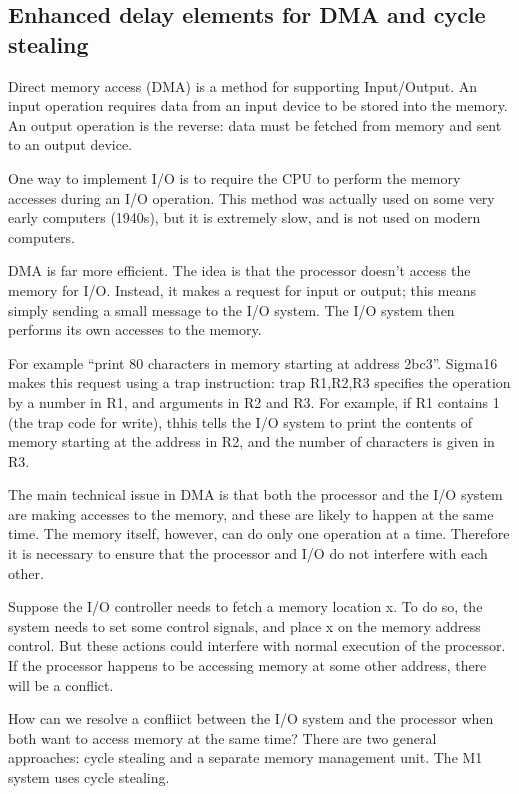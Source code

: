 \documentclass[11pt]{article}
\begin{document}
\subsection{Enhanced delay elements for DMA and cycle stealing}
\label{sec:org648e636}

Direct memory access (DMA) is a method for supporting Input/Output.
An input operation requires data from an input device to be stored
into the memory.  An output operation is the reverse: data must be
fetched from memory and sent to an output device.

One way to implement I/O is to require the CPU to perform the memory
accesses during an I/O operation.  This method was actually used on
some very early computers (1940s), but it is extremely slow, and is
not used on modern computers.

DMA is far more efficient.  The idea is that the processor doesn't
access the memory for I/O.  Instead, it makes a request for input or
output; this means simply sending a small message to the I/O system.
The I/O system then performs its own accesses to the memory.

For example ``print 80 characters in memory starting at address
2bc3''.  Sigma16 makes this request using a trap instruction: trap
R1,R2,R3 specifies the operation by a number in R1, and arguments in
R2 and R3.  For example, if R1 contains 1 (the trap code for write),
thhis tells the I/O system to print the contents of memory starting at
the address in R2, and the number of characters is given in R3.

The main technical issue in DMA is that both the processor and the I/O
system are making accesses to the memory, and these are likely to
happen at the same time.  The memory itself, however, can do only one
operation at a time.  Therefore it is necessary to ensure that the
processor and I/O do not interfere with each other.

Suppose the I/O controller needs to fetch a memory location x.  To do
so, the system needs to set some control signals, and place x on the
memory address control.  But these actions could interfere with normal
execution of the processor.  If the processor happens to be accessing
memory at some other address, there will be a conflict.

How can we resolve a confliict between the I/O system and the
processor when both want to access memory at the same time?  There are
two general approaches: cycle stealing and a separate memory
management unit.  The M1 system uses cycle stealing.
\end{document}
